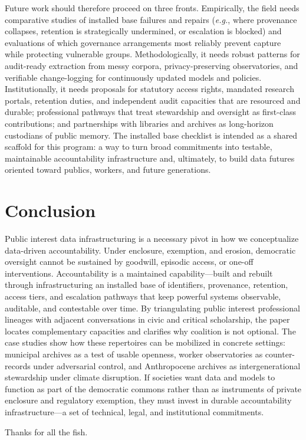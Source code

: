 \documentclass[acmsmall,screen]{acmart}
\begin{document}
Future work should therefore proceed on three fronts. Empirically, the field needs comparative studies of installed base failures and repairs (\textit{e.g.}, where provenance collapses, retention is strategically undermined, or escalation is blocked) and evaluations of which governance arrangements most reliably prevent capture while protecting vulnerable groups. Methodologically, it needs robust patterns for audit-ready extraction from messy corpora, privacy-preserving observatories, and verifiable change-logging for continuously updated models and policies. Institutionally, it needs proposals for statutory access rights, mandated research portals, retention duties, and independent audit capacities that are resourced and durable; professional pathways that treat stewardship and oversight as first-class contributions; and partnerships with libraries and archives as long-horizon custodians of public memory. The installed base checklist is intended as a shared scaffold for this program: a way to turn broad commitments into testable, maintainable accountability infrastructure and, ultimately, to build data futures oriented toward publics, workers, and future generations.

\section*{Conclusion}
Public interest data infrastructuring is a necessary pivot in how we conceptualize data-driven accountability. Under enclosure, exemption, and erosion, democratic oversight cannot be sustained by goodwill, episodic access, or one-off interventions. Accountability is a maintained capability---built and rebuilt through infrastructuring an installed base of identifiers, provenance, retention, access tiers, and escalation pathways that keep powerful systems observable, auditable, and contestable over time. By triangulating public interest professional lineages with adjacent conversations in civic and critical scholarship, the paper locates complementary capacities and clarifies why coalition is not optional. The case studies show how these repertoires can be mobilized in concrete settings: municipal archives as a test of usable openness, worker observatories as counter-records under adversarial control, and Anthropocene archives as intergenerational stewardship under climate disruption. If societies want data and models to function as part of the democratic commons rather than as instruments of private enclosure and regulatory exemption, they must invest in durable accountability infrastructure---a set of technical, legal, and institutional commitments.

\begin{acks}
Thanks for all the fish.
\end{acks}



\end{document}
